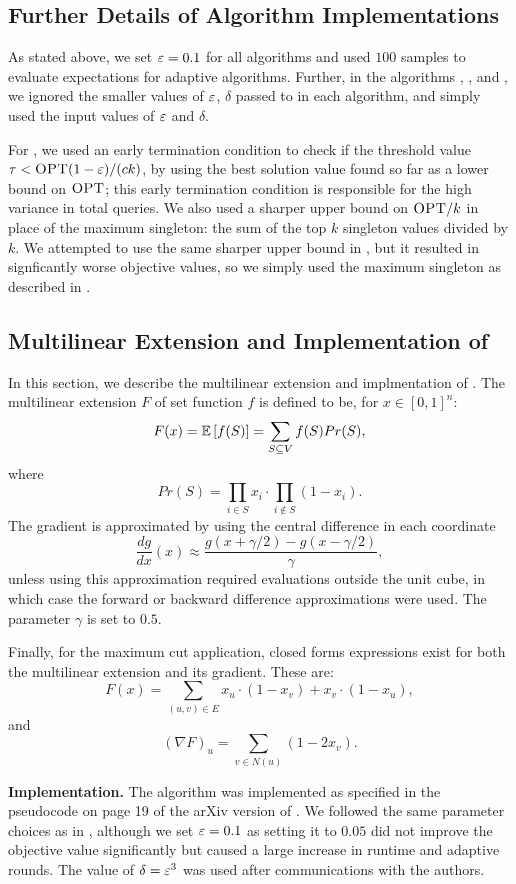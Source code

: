 \subsection{Further Details of Algorithm Implementations}
\label{apx:algimpl}
As stated above, we set $\varepsilon = 0.1$ for all algorithms
and used $100$ samples to evaluate expectations for adaptive algorithms.
Further, in the algorithms \algOnefullname, \algTwofullname, and \anm,
we ignored the smaller values of $\varepsilon$, $\delta$ passed to \thresam in each algorithm,
and simply used the input values of $\varepsilon$ and $\delta$.

For \algTwofullname, we used an early termination condition to check if the threshold
value $\tau < \textsc{OPT} (1 - \varepsilon ) / (ck)$, by using the best solution value found so far
as a lower bound on $\textsc{OPT}$; this early termination condition is responsible for
the high variance in total queries. We also used a sharper upper bound on $\textsc{OPT} / k$ in place
of the maximum singleton: the sum of the top $k$ singleton values divided by $k$. We
attempted to use the same sharper upper bound in \anm, but it resulted in signficantly worse
objective values, so we simply used the maximum singleton as described in .


\subsection{Multilinear Extension and Implementation of } \label{apx:ene}
In this section, we describe the multilinear extension and implmentation of 
. The multilinear extension $F$
of set function $f$ is defined to be, for $x \in [0,1]^n$:
$$ F(x) = \mathbb{E} \left[  f(S)  \right] = \sum_{S \subseteq V} f(S) Pr(S), $$
where $$Pr(S) = \prod_{i \in S} x_i \cdot \prod_{i \not \in S} (1 - x_i).$$
The gradient is approximated by using the central difference in each coordinate
$$ \frac{dg}{dx}(x) \approx \frac{g( x + \gamma / 2 ) - g(x - \gamma /2)}{\gamma}, $$
unless using this approximation required evaluations outside the unit cube, in which
case the forward or backward difference approximations were used. 
The parameter $\gamma$ is set to $0.5$.

Finally, for the maximum cut application, closed forms expressions exist for
both the multilinear extension and its gradient. These are:
$$ F(x) = \sum_{(u,v) \in E} x_u \cdot (1 - x_v ) + x_v \cdot (1 - x_u), $$
and
$$(\nabla F)_u  = \sum_{v \in N(u)} (1 - 2x_v). $$

\textbf{Implementation.} The algorithm was implemented as specified in the pseudocode on page
19 of the arXiv version
of . We followed the same parameter choices as in
, although we set $\varepsilon = 0.1$ as setting it to $0.05$
did not improve the objective value significantly but caused a large increase
in runtime and adaptive rounds. The value of $\delta = \varepsilon^3$ was used
after communications with the authors. 
